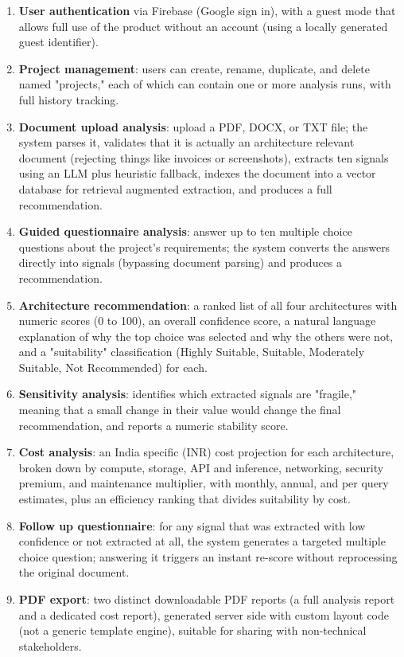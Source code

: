 \documentclass[11pt,a4paper]{report}
\begin{document}
\begin{enumerate}[leftmargin=*]
  \item \textbf{User authentication} via Firebase (Google sign in), with a guest mode that allows full use of the product without an account (using a locally generated guest identifier).
  \item \textbf{Project management}: users can create, rename, duplicate, and delete named "projects," each of which can contain one or more analysis runs, with full history tracking.
  \item \textbf{Document upload analysis}: upload a PDF, DOCX, or TXT file; the system parses it, validates that it is actually an architecture relevant document (rejecting things like invoices or screenshots), extracts ten signals using an LLM plus heuristic fallback, indexes the document into a vector database for retrieval augmented extraction, and produces a full recommendation.
  \item \textbf{Guided questionnaire analysis}: answer up to ten multiple choice questions about the project's requirements; the system converts the answers directly into signals (bypassing document parsing) and produces a recommendation.
  \item \textbf{Architecture recommendation}: a ranked list of all four architectures with numeric scores (0 to 100), an overall confidence score, a natural language explanation of why the top choice was selected and why the others were not, and a "suitability" classification (Highly Suitable, Suitable, Moderately Suitable, Not Recommended) for each.
  \item \textbf{Sensitivity analysis}: identifies which extracted signals are "fragile," meaning that a small change in their value would change the final recommendation, and reports a numeric stability score.
  \item \textbf{Cost analysis}: an India specific (INR) cost projection for each architecture, broken down by compute, storage, API and inference, networking, security premium, and maintenance multiplier, with monthly, annual, and per query estimates, plus an efficiency ranking that divides suitability by cost.
  \item \textbf{Follow up questionnaire}: for any signal that was extracted with low confidence or not extracted at all, the system generates a targeted multiple choice question; answering it triggers an instant re-score without reprocessing the original document.
  \item \textbf{PDF export}: two distinct downloadable PDF reports (a full analysis report and a dedicated cost report), generated server side with custom layout code (not a generic template engine), suitable for sharing with non-technical stakeholders.

\end{enumerate}
\end{document}
